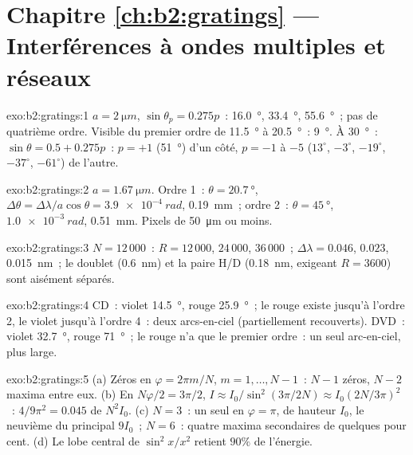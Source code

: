 \section*{Chapitre \ref{ch:b2:gratings} --- Interférences à ondes multiples et réseaux}

\begin{solution}{exo:b2:gratings:1}
$a = \qty{2}{\micro m}$, $\sin\theta_p = 0.275p$~: \qty{16.0}{\degree}, \qty{33.4}{\degree}, \qty{55.6}{\degree}~;
pas de quatrième ordre. Visible du premier ordre de \qty{11.5}{\degree} à \qty{20.5}{\degree}~:
\qty{9}{\degree}. À \qty{30}{\degree}~: $\sin\theta = 0.5 + 0.275p$~: $p = +1$ (\qty{51}{\degree}) d'un
côté, $p = -1$ à $-5$ ($13^\circ$, $-3^\circ$, $-19^\circ$, $-37^\circ$, $-61^\circ$) de
l'autre.
\end{solution}

\begin{solution}{exo:b2:gratings:2}
$a = \qty{1.67}{\micro m}$. Ordre 1~: $\theta = \qty{20.7}{\degree}$, $\Delta\theta = \Delta\lambda/a\cos\theta =
\qty{3.9e-4}{rad}$, \qty{0.19}{mm}~; ordre 2~: $\theta = \qty{45}{\degree}$, $\qty{1.0e-3}{rad}$,
\qty{0.51}{mm}. Pixels de \qty{50}{\micro m} ou moins.
\end{solution}

\begin{solution}{exo:b2:gratings:3}
$N = 12\,000$~: $R = 12\,000$, $24\,000$, $36\,000$~; $\Delta\lambda = 0.046$, $0.023$, \qty{0.015}{nm}~;
le doublet (\qty{0.6}{nm}) et la paire H/D (\qty{0.18}{nm}, exigeant $R = 3600$)
sont aisément séparés.
\end{solution}

\begin{solution}{exo:b2:gratings:4}
CD~: violet \qty{14.5}{\degree}, rouge \qty{25.9}{\degree}~; le rouge existe jusqu'à l'ordre 2, le violet jusqu'à
l'ordre 4~: deux arcs-en-ciel (partiellement recouverts). DVD~: violet \qty{32.7}{\degree}, rouge
\qty{71}{\degree}~; le rouge n'a que le premier ordre~: un seul arc-en-ciel, plus large.
\end{solution}

\begin{solution}{exo:b2:gratings:5}
(a) Zéros en $\varphi = 2\pi m/N$, $m = 1, \dots, N - 1$~: $N - 1$ zéros, $N - 2$ maxima
entre eux. (b) En $N\varphi/2 = 3\pi/2$, $I \approx I_0/\sin^2(3\pi/2N) \approx I_0(2N/3\pi)^2$~:
$4/9\pi^2 = 0.045$ de $N^2I_0$. (c) $N = 3$~: un seul  en
$\varphi = \pi$, de hauteur $I_0$, le neuvième du principal $9I_0$~; $N = 6$~: quatre
maxima secondaires de quelques pour cent. (d) Le lobe central de $\sin^2x/x^2$
retient $90\%$ de l'énergie.
\end{solution}

